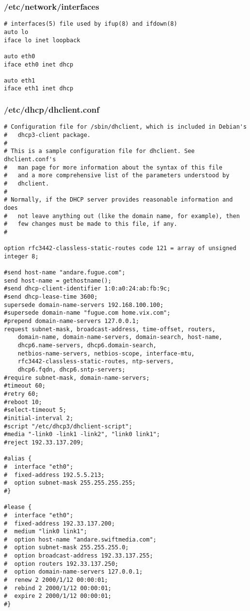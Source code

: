 \subsubsection{/etc/network/interfaces}
\begin{lstlisting}
# interfaces(5) file used by ifup(8) and ifdown(8)
auto lo
iface lo inet loopback

auto eth0
iface eth0 inet dhcp

auto eth1
iface eth1 inet dhcp
\end{lstlisting}

\subsubsection{/etc/dhcp/dhclient.conf}
\begin{lstlisting}
# Configuration file for /sbin/dhclient, which is included in Debian's
#	dhcp3-client package.
#
# This is a sample configuration file for dhclient. See dhclient.conf's
#	man page for more information about the syntax of this file
#	and a more comprehensive list of the parameters understood by
#	dhclient.
#
# Normally, if the DHCP server provides reasonable information and does
#	not leave anything out (like the domain name, for example), then
#	few changes must be made to this file, if any.
#

option rfc3442-classless-static-routes code 121 = array of unsigned integer 8;

#send host-name "andare.fugue.com";
send host-name = gethostname();
#send dhcp-client-identifier 1:0:a0:24:ab:fb:9c;
#send dhcp-lease-time 3600;
supersede domain-name-servers 192.168.100.100;
#supersede domain-name "fugue.com home.vix.com";
#prepend domain-name-servers 127.0.0.1;
request subnet-mask, broadcast-address, time-offset, routers,
	domain-name, domain-name-servers, domain-search, host-name,
	dhcp6.name-servers, dhcp6.domain-search,
	netbios-name-servers, netbios-scope, interface-mtu,
	rfc3442-classless-static-routes, ntp-servers,
	dhcp6.fqdn, dhcp6.sntp-servers;
#require subnet-mask, domain-name-servers;
#timeout 60;
#retry 60;
#reboot 10;
#select-timeout 5;
#initial-interval 2;
#script "/etc/dhcp3/dhclient-script";
#media "-link0 -link1 -link2", "link0 link1";
#reject 192.33.137.209;

#alias {
#  interface "eth0";
#  fixed-address 192.5.5.213;
#  option subnet-mask 255.255.255.255;
#}

#lease {
#  interface "eth0";
#  fixed-address 192.33.137.200;
#  medium "link0 link1";
#  option host-name "andare.swiftmedia.com";
#  option subnet-mask 255.255.255.0;
#  option broadcast-address 192.33.137.255;
#  option routers 192.33.137.250;
#  option domain-name-servers 127.0.0.1;
#  renew 2 2000/1/12 00:00:01;
#  rebind 2 2000/1/12 00:00:01;
#  expire 2 2000/1/12 00:00:01;
#}
\end{lstlisting}

